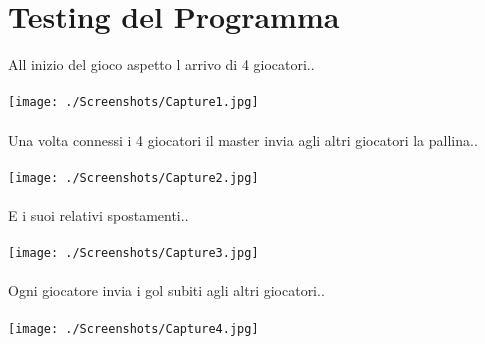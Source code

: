﻿\documentclass[11pt, a4paper, titlepage, block]{article}
\begin{document}
\newpage
\section{Testing del Programma}

All inizio del gioco aspetto l arrivo di 4 giocatori..\\\\
\texttt{[image: ./Screenshots/Capture1.jpg]}
\\
\\
Una volta connessi i 4 giocatori il master invia agli altri giocatori la pallina..\\\\
\texttt{[image: ./Screenshots/Capture2.jpg]}
\\
\\
E i suoi relativi spostamenti.. \\\\
\texttt{[image: ./Screenshots/Capture3.jpg]}
\\
\\
Ogni giocatore invia i gol subiti agli altri giocatori..\\\\
\texttt{[image: ./Screenshots/Capture4.jpg]}
	\\
	\\
\end{document}
